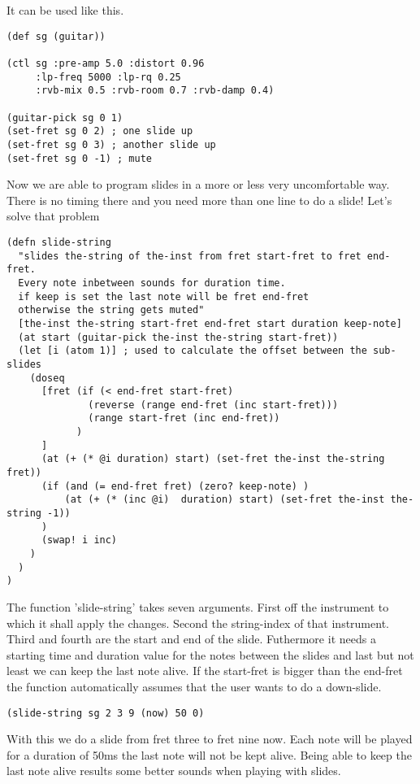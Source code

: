 It can be used like this.

\begin{lstlisting}
(def sg (guitar))

(ctl sg :pre-amp 5.0 :distort 0.96
     :lp-freq 5000 :lp-rq 0.25
     :rvb-mix 0.5 :rvb-room 0.7 :rvb-damp 0.4)

(guitar-pick sg 0 1)
(set-fret sg 0 2) ; one slide up
(set-fret sg 0 3) ; another slide up
(set-fret sg 0 -1) ; mute
\end{lstlisting}

Now we are able to program slides in a more or less very uncomfortable way. There is no timing there and you need more than one line to do a slide!
Let's solve that problem

\begin{lstlisting}
(defn slide-string
  "slides the-string of the-inst from fret start-fret to fret end-fret.
  Every note inbetween sounds for duration time.
  if keep is set the last note will be fret end-fret
  otherwise the string gets muted"
  [the-inst the-string start-fret end-fret start duration keep-note]
  (at start (guitar-pick the-inst the-string start-fret))
  (let [i (atom 1)] ; used to calculate the offset between the sub-slides
    (doseq 
      [fret (if (< end-fret start-fret) 
              (reverse (range end-fret (inc start-fret)))
              (range start-fret (inc end-fret))
            )
      ]
      (at (+ (* @i duration) start) (set-fret the-inst the-string fret))
      (if (and (= end-fret fret) (zero? keep-note) ) 
          (at (+ (* (inc @i)  duration) start) (set-fret the-inst the-string -1))
      )
      (swap! i inc)
    )
  )
)
\end{lstlisting}

The function 'slide-string' takes seven arguments. First off the instrument to which it shall apply the changes. Second the string-index of that instrument. Third and fourth are the start and end of the slide. Futhermore it needs a starting time and duration value for the notes between the slides and last but not least we can keep the last note alive. If the start-fret is bigger than the end-fret the function automatically assumes that the user wants to do a down-slide.

\begin{lstlisting}
(slide-string sg 2 3 9 (now) 50 0)
\end{lstlisting}

With this we do a slide from fret three to fret nine now. Each note will be played for a duration of 50ms the last note will not be kept alive. Being able to keep the last note alive results some better sounds when playing with slides.

